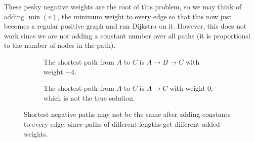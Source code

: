   These pesky negative weights are the root of this problem, so we may think of adding $\min(v)$, the minimum weight to every edge so that this now just becomes a regular positive graph and run Dijkstra on it. However, this does not work since we are not adding a constant number over all paths (it is proportional to the number of nodes in the path). 

  \begin{figure}[H]
    \centering
    \begin{subfigure}[b]{0.48\textwidth}
      \centering
      \caption{The shortest path from $A$ to $C$ is $A \rightarrow B \rightarrow C$ with weight $-4$. }
    \end{subfigure}
    \hfill 
    \begin{subfigure}[b]{0.48\textwidth}
      \centering
      \caption{The shortest path from $A$ to $C$ is $A \rightarrow C$ with weight $0$, which is not the true solution.}
    \end{subfigure}
    \caption{Shortest negative paths may not be the same after adding constants to every edge, since paths of different lengths get different added weights.}
    \label{fig:dij_not_for_bellman}
  \end{figure}

